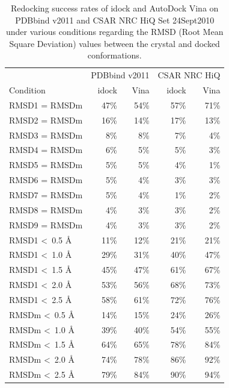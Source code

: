 \documentclass[12pt]{article}
\begin{document}
\clearpage

\begin{table}
\centering
\begin{tabular}{lrrrr}
\hline
& \multicolumn{2}{c}{PDBbind v2011} & \multicolumn{2}{c}{CSAR NRC HiQ}\\
Condition & idock & Vina & idock & Vina\\
\hline
RMSD1 = RMSDm           & 47\% & 54\% & 57\% & 71\%\\
RMSD2 = RMSDm           & 16\% & 14\% & 17\% & 13\%\\
RMSD3 = RMSDm           &  8\% &  8\% &  7\% &  4\%\\
RMSD4 = RMSDm           &  6\% &  5\% &  5\% &  3\%\\
RMSD5 = RMSDm           &  5\% &  5\% &  4\% &  1\%\\
RMSD6 = RMSDm           &  5\% &  4\% &  3\% &  3\%\\
RMSD7 = RMSDm           &  5\% &  4\% &  1\% &  2\%\\
RMSD8 = RMSDm           &  4\% &  3\% &  3\% &  2\%\\
RMSD9 = RMSDm           &  4\% &  3\% &  3\% &  2\%\\
\noalign{\smallskip}
RMSD1 \textless\ 0.5 \AA & 11\% & 12\% & 21\% & 21\%\\
RMSD1 \textless\ 1.0 \AA & 29\% & 31\% & 40\% & 47\%\\
RMSD1 \textless\ 1.5 \AA & 45\% & 47\% & 61\% & 67\%\\
RMSD1 \textless\ 2.0 \AA & 53\% & 56\% & 68\% & 73\%\\
RMSD1 \textless\ 2.5 \AA & 58\% & 61\% & 72\% & 76\%\\
\noalign{\smallskip}
RMSDm \textless\ 0.5 \AA & 14\% & 15\% & 24\% & 26\%\\
RMSDm \textless\ 1.0 \AA & 39\% & 40\% & 54\% & 55\%\\
RMSDm \textless\ 1.5 \AA & 64\% & 65\% & 78\% & 84\%\\
RMSDm \textless\ 2.0 \AA & 74\% & 78\% & 86\% & 92\%\\
RMSDm \textless\ 2.5 \AA & 79\% & 84\% & 90\% & 94\%\\
\hline
\end{tabular}
\caption{\label{SuccessRate} Redocking success rates of idock and AutoDock Vina on PDBbind v2011 and CSAR NRC HiQ Set 24Sept2010 under various conditions regarding the RMSD (Root Mean Square Deviation) values between the crystal and docked conformations.}
\end{table}
\end{document}

